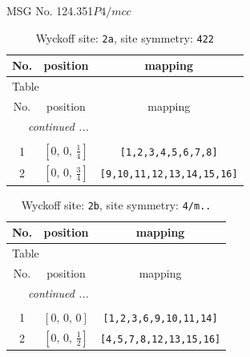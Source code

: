 \documentclass[fleqn,8pt]{jsarticle}
\begin{document}
\setcounter{MaxMatrixCols}{32}

\renewcommand{\tablename}{Table~}
\renewcommand{\figurename}{Figure~}
\begin{center}
\LARGE
MSG No. 124.351\quad$P4/mcc$
\end{center}
\renewcommand{\arraystretch}{1.2}
\begin{longtable}{ccc}
\caption{Wyckoff site: {\tt 2a}, site symmetry: {\tt 422}}
 \\
 \hline \hline
No. & position & mapping \\ \hline \endfirsthead

\multicolumn{2}{l}{\tablename\ \thetable{}} \\
 \hline \hline
No. & position & mapping \\ \hline \endhead

 \hline \hline
\multicolumn{2}{r}{\footnotesize\it continued ...} \\ \endfoot

 \hline \hline
\multicolumn{2}{r}{} \\ \endlastfoot

1 & $\left[ 0,\, 0,\, \frac{1}{4} \right]$ & {\tt [1,2,3,4,5,6,7,8]} \\ \hline
2 & $\left[ 0,\, 0,\, \frac{3}{4} \right]$ & {\tt [9,10,11,12,13,14,15,16]} \\
\end{longtable}
\renewcommand{\arraystretch}{1.2}
\begin{longtable}{ccc}
\caption{Wyckoff site: {\tt 2b}, site symmetry: {\tt 4/m..}}
 \\
 \hline \hline
No. & position & mapping \\ \hline \endfirsthead

\multicolumn{2}{l}{\tablename\ \thetable{}} \\
 \hline \hline
No. & position & mapping \\ \hline \endhead

 \hline \hline
\multicolumn{2}{r}{\footnotesize\it continued ...} \\ \endfoot

 \hline \hline
\multicolumn{2}{r}{} \\ \endlastfoot

1 & $\left[ 0,\, 0,\, 0 \right]$ & {\tt [1,2,3,6,9,10,11,14]} \\ \hline
2 & $\left[ 0,\, 0,\, \frac{1}{2} \right]$ & {\tt [4,5,7,8,12,13,15,16]} \\
\end{longtable}
\end{document}
